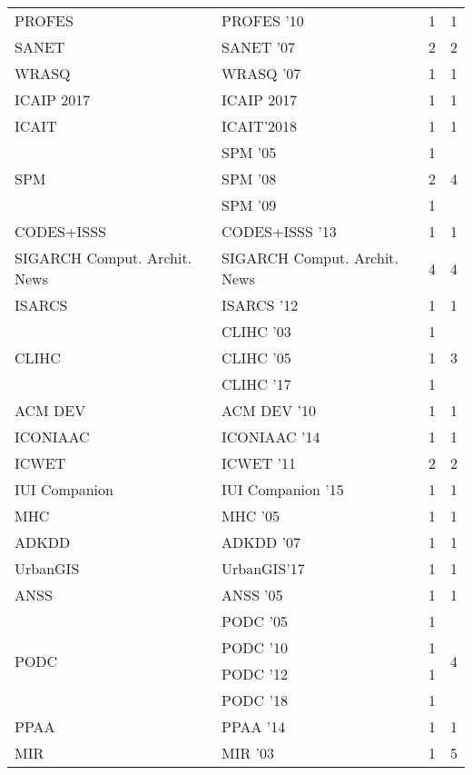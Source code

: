 \begin{table*}[t]
\begin{tabular}{llrr}
\multirow{1}{*}{PROFES } & PROFES '10 & 1 & \multirow{1}{*}{1}\\
\multirow{1}{*}{SANET } & SANET '07 & 2 & \multirow{1}{*}{2}\\
\multirow{1}{*}{WRASQ } & WRASQ '07 & 1 & \multirow{1}{*}{1}\\
\multirow{1}{*}{ICAIP 2017} & ICAIP 2017 & 1 & \multirow{1}{*}{1}\\
\multirow{1}{*}{ICAIT} & ICAIT'2018 & 1 & \multirow{1}{*}{1}\\
\multirow{3}{*}{SPM } & SPM '05 & 1 & \multirow{3}{*}{4}\\
& SPM '08 & 2 &\\
& SPM '09 & 1 &\\
\multirow{1}{*}{CODES+ISSS } & CODES+ISSS '13 & 1 & \multirow{1}{*}{1}\\
\multirow{1}{*}{SIGARCH Comput. Archit. News} & SIGARCH Comput. Archit. News & 4 & \multirow{1}{*}{4}\\
\multirow{1}{*}{ISARCS } & ISARCS '12 & 1 & \multirow{1}{*}{1}\\
\multirow{3}{*}{CLIHC } & CLIHC '03 & 1 & \multirow{3}{*}{3}\\
& CLIHC '05 & 1 &\\
& CLIHC '17 & 1 &\\
\multirow{1}{*}{ACM DEV } & ACM DEV '10 & 1 & \multirow{1}{*}{1}\\
\multirow{1}{*}{ICONIAAC } & ICONIAAC '14 & 1 & \multirow{1}{*}{1}\\
\multirow{1}{*}{ICWET } & ICWET '11 & 2 & \multirow{1}{*}{2}\\
\multirow{1}{*}{IUI Companion } & IUI Companion '15 & 1 & \multirow{1}{*}{1}\\
\multirow{1}{*}{MHC } & MHC '05 & 1 & \multirow{1}{*}{1}\\
\multirow{1}{*}{ADKDD } & ADKDD '07 & 1 & \multirow{1}{*}{1}\\
\multirow{1}{*}{UrbanGIS} & UrbanGIS'17 & 1 & \multirow{1}{*}{1}\\
\multirow{1}{*}{ANSS } & ANSS '05 & 1 & \multirow{1}{*}{1}\\
\multirow{4}{*}{PODC } & PODC '05 & 1 & \multirow{4}{*}{4}\\
& PODC '10 & 1 &\\
& PODC '12 & 1 &\\
& PODC '18 & 1 &\\
\multirow{1}{*}{PPAA } & PPAA '14 & 1 & \multirow{1}{*}{1}\\
\multirow{4}{*}{MIR } & MIR '03 & 1 & \multirow{4}{*}{5}\\

\end{tabular}
\end{table*}
